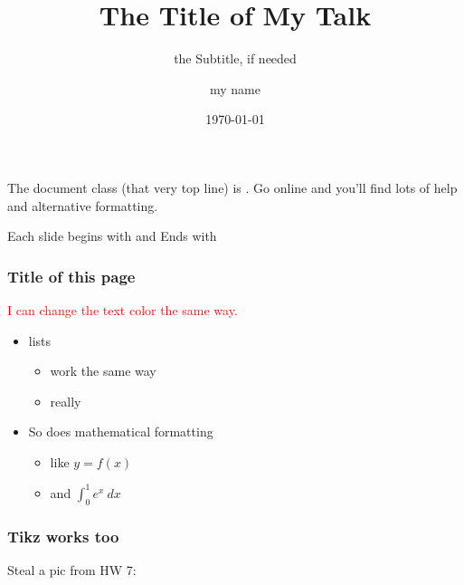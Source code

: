 \documentclass{beamer}
\title{The Title of My Talk}
\subtitle{the Subtitle, if needed}
\author{my name}
\institute{University of Alaska Fairbanks}
\date{\today}
\newcommand{\vertex}{\node[vertex]}
\begin{document}
 \begin{frame}
\titlepage
\end{frame}

\begin{frame}

The document class (that very top line) is . Go online and you'll find lots of help and alternative formatting.

\begin{center}

Each slide begins with  
\vfill
and
\vfill
Ends with  

\end{center}

\end{frame}

\begin{frame}
\frametitle{Title of this page}
\vfill
\textcolor{red}{I can change the text color the same way.}
\begin{itemize}
	\item lists 
	\vfill
	\begin{itemize}
		\item work the same way
		\item really
		\vfill
	\end{itemize}
	\item So does mathematical formatting
	\vfill
	\begin{itemize}
		\item like $y=f(x)$
		\item and $\displaystyle{\int_0^1 e^x \: dx}$
		\vfill
	\end{itemize}
\end{itemize}
\end{frame}

\begin{frame}
\frametitle{Tikz works too}
Steal a pic from HW 7:\\

\begin{center}
\end{center}
\end{frame}
\end{document}
